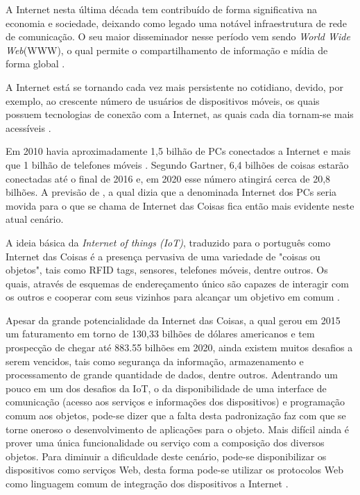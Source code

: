 A Internet nesta última década tem contribuído de forma significativa na economia e sociedade, deixando como legado uma notável infraestrutura de rede de comunicação. O seu maior disseminador nesse período vem sendo \textit{World Wide Web}(WWW), o qual permite o compartilhamento de informação e mídia de forma global \cite{Chandrakanth:2014}.

A Internet está se tornando cada vez mais persistente no cotidiano, devido, por exemplo, ao crescente número de usuários de dispositivos móveis, os quais possuem tecnologias de conexão com a Internet, as quais cada dia tornam-se mais acessíveis \cite{Chandrakanth:2014}.

Em 2010 havia aproximadamente 1,5 bilhão de PCs conectados a Internet e mais que 1 bilhão de telefones móveis \cite{Sundmaeker:2010}. Segundo Gartner\footnotemark {}, 6,4 bilhões de coisas estarão conectadas até o final de 2016 e, em 2020 esse número atingirá cerca de 20,8 bilhões. A previsão de \cite{Sundmaeker:2010}, a qual dizia que a denominada Internet dos PCs seria movida para o que se chama de Internet das Coisas fica então mais evidente neste atual cenário.

A ideia básica da \textit{Internet of things (IoT)}, traduzido para o português como Internet das Coisas é a presença pervasiva de uma variedade de "coisas ou objetos", tais como RFID tags, sensores, telefones móveis, dentre outros. Os quais, através de esquemas de endereçamento único são capazes de interagir com os outros e cooperar com seus vizinhos para alcançar um objetivo em comum \cite{Atzori:2010}.

Apesar da grande potencialidade da Internet das Coisas, a qual gerou em 2015 um faturamento em torno de 130,33 bilhões de dólares americanos e tem prospecção de chegar até 883.55 bilhões em 2020\footnotemark {}, ainda existem muitos desafios a serem vencidos, tais como segurança da informação, armazenamento e processamento de grande quantidade de dados, dentre outros. Adentrando um pouco em um dos desafios da IoT, o da disponibilidade de uma interface de comunicação (acesso aos serviços e informações dos dispositivos) e programação comum aos objetos, pode-se dizer que a falta desta padronização faz com que se torne oneroso o desenvolvimento de aplicações para o objeto. Mais difícil ainda é prover uma única funcionalidade ou serviço com a composição dos diversos objetos. Para diminuir a dificuldade deste cenário, pode-se disponibilizar os dispositivos como serviços Web, desta forma pode-se utilizar os protocolos Web como linguagem comum de integração dos dispositivos a Internet \cite{Franca:2011}.

